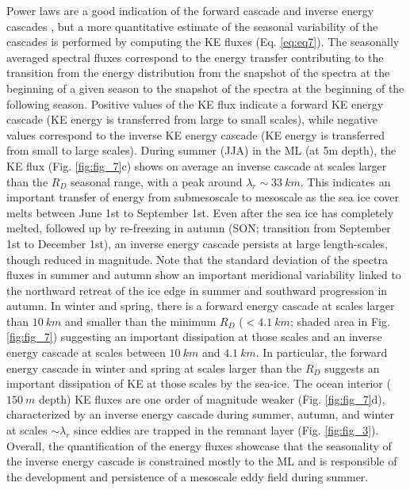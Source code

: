 \documentclass[draft]{agujournal2019}
\begin{document}
Power laws are a good indication of the forward cascade and inverse energy cascades \citep{Vallis_atmospheric_2017}, but a more quantitative estimate of the seasonal variability of the cascades is performed by computing the KE fluxes (Eq. \ref{eq:eq7}). The seasonally averaged spectral fluxes correspond to the energy transfer contributing to the transition from the energy distribution from the snapshot of the spectra at the beginning of a given season to the snapshot of the spectra at the beginning of the following season. Positive values of the KE flux indicate a forward KE energy cascade (KE energy is transferred from large to small scales), while negative values correspond to the inverse KE energy cascade (KE energy is transferred from small to large scales). During summer (JJA) in the ML (at 5m depth), the KE flux (Fig. \ref{fig:fig_7}c) shows on average an inverse cascade at scales larger than the $R_D$ seasonal range, with a peak around $\lambda_r \sim 33\ km$. This indicates an important transfer of energy from submesoscale to mesoscale as the sea ice cover melts between June 1st to September 1st. Even after the sea ice has completely melted, followed up by re-freezing in autumn (SON; transition from September 1st to December 1st), an inverse energy cascade persists at large length-scales, though reduced in magnitude. Note that the standard deviation of the spectra fluxes in summer and autumn show an important meridional variability linked to the northward retreat of the ice edge in summer and southward progression in autumn.
In winter and spring, there is a forward energy cascade at scales larger than $10\ km$ and smaller than the minimum $R_D$ ($<4.1\ km$; shaded area in Fig.\ref{fig:fig_7}) suggesting an important dissipation at those scales and an inverse energy cascade at scales between $10\ km$ and $4.1\ km$. 
In particular, the forward energy cascade in winter and spring at scales larger than the $\overline{R_D}$ suggests an important dissipation of KE at those scales by the sea-ice.
The ocean interior ($150\ m$ depth) KE fluxes are one order of magnitude weaker (Fig. \ref{fig:fig_7}d), characterized by an inverse energy cascade during summer, autumn, and winter at scales $\sim \lambda_r$ since eddies are trapped in the remnant layer (Fig. \ref{fig:fig_3}).
Overall, the quantification of the energy fluxes showcase that the seasonality of the inverse energy cascade is constrained mostly to the ML and is responsible of the development and persistence of a mesoscale eddy field during summer. 
\end{document}
